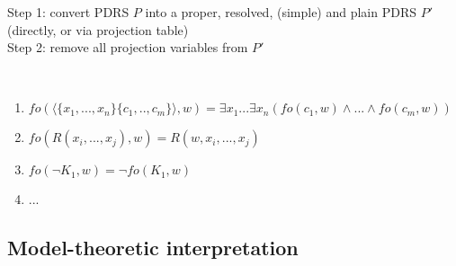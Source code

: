 Step 1: convert PDRS $P$ into a proper, resolved, (simple) and plain PDRS $P'$ (directly, or via projection table)\\

\noindent Step 2: remove all projection variables from $P'$


\begin{definition}~
  \begin{enumerate}
    \item $fo(\langle\{x_1,...,x_n\}\{c_1,..,c_m\}\rangle,w) 
      = \exists x_1...\exists x_n(fo(c_1,w)\wedge...\wedge fo(c_m,w))$
    \item $fo(R(x_i,...,x_j),w) = R(w,x_i,...,x_j)$
    \item $fo(\neg K_1,w) = \neg fo(K_1,w)$
    \item ...
  \end{enumerate}
\end{definition}


\subsection{Model-theoretic interpretation}

